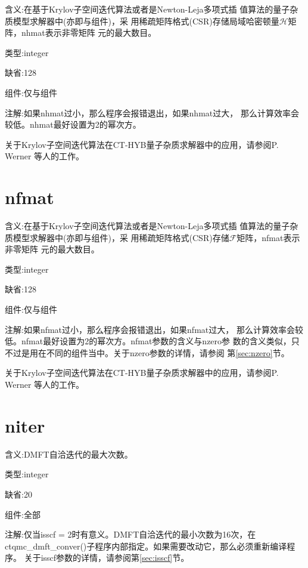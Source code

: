 {\color{red}含义}:在基于Krylov子空间迭代算法或者是Newton-Leja多项式插
值算法的量子杂质模型求解器中(亦即{\camellia}与{\epiphyllum}组件)，采
用稀疏矩阵格式(CSR)存储局域哈密顿量$\mathcal{H}$矩阵，nhmat表示非零矩阵
元的最大数目。

{\color{green}类型}:integer

{\color{blue}缺省}:128

{\color{brown}组件}:仅{\camellia}与{\epiphyllum}组件

{\color{purple}注解}:如果nhmat过小，那么程序会报错退出，如果nhmat过大，
那么计算效率会较低。nhmat最好设置为2的幂次方。

关于Krylov子空间迭代算法在CT-HYB量子杂质求解器中的应用，请参阅P. Werner
等人的工作\cite{lauchli:235117}。

\section{nfmat }
\label{sec:nfmat}

{\color{red}含义}:在基于Krylov子空间迭代算法或者是Newton-Leja多项式插
值算法的量子杂质模型求解器中(亦即{\camellia}与{\epiphyllum}组件)，采
用稀疏矩阵格式(CSR)存储$\mathcal{F}$矩阵，nfmat表示非零矩阵
元的最大数目。

{\color{green}类型}:integer

{\color{blue}缺省}:128

{\color{brown}组件}:仅{\camellia}与{\epiphyllum}组件

{\color{purple}注解}:如果nfmat过小，那么程序会报错退出，如果nfmat过大，
那么计算效率会较低。nfmat最好设置为2的幂次方。nfmat参数的含义与nzero参
数的含义类似，只不过是用在不同的组件当中。关于nzero参数的详情，请参阅
第\ref{sec:nzero}节。

关于Krylov子空间迭代算法在CT-HYB量子杂质求解器中的应用，请参阅P. Werner
等人的工作\cite{lauchli:235117}。

\section{niter }
\label{sec:niter}

{\color{red}含义}:DMFT自洽迭代的最大次数。

{\color{green}类型}:integer

{\color{blue}缺省}:20

{\color{brown}组件}:全部

{\color{purple}注解}:仅当isscf = 2时有意义。DMFT自洽迭代的最小次数为16次，在
ctqmc\_dmft\_conver()子程序内部指定。如果需要改动它，那么必须重新编译程序。
关于isscf参数的详情，请参阅第\ref{sec:isscf}节。

